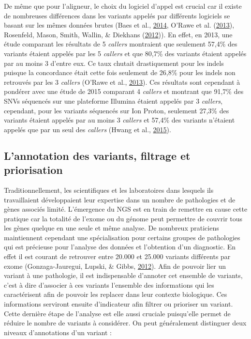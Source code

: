 \documentclass[12pt,twoside]{reedthesis}
\theoremstyle{definition}
\theoremstyle{definition}
\theoremstyle{remark}
\begin{document}
  De même que pour l'aligneur, le choix du logiciel d'appel est crucial
  car il existe de nombreuses différences dans les variants appelés par
  différents logiciels se basant sur les mêmes données brutes (Baes et
  al., \protect\hyperlink{ref-Baes2014}{2014}, O'Rawe et al.
  (\protect\hyperlink{ref-ORawe2013}{2013}), Rosenfeld, Mason, Smith,
  Wallin, \& Diekhans (\protect\hyperlink{ref-Rosenfeld2012}{2012})). En
  effet, en 2013, une étude comparant les résultats de 5 \emph{callers}
  montraient que seulement 57,4\% des variants étaient appelés par les 5
  \emph{callers} et que 80,7\% des variants étaient appelés par au moins 3
  d'entre eux. Ce taux chutait drastiquement pour les indels puisque la
  concordance était cette fois seulement de 26,8\% pour les indels non
  retrouvés par les 3 \emph{callers} (O'Rawe et al.,
  \protect\hyperlink{ref-ORawe2013}{2013}). Ces résultats sont cependant à
  pondérer avec une étude de 2015 comparant 4 \emph{callers} et montrant
  que 91,7\% des SNVs séquencés sur une plateforme Illumina étaient
  appelés par 3 \emph{callers}, cependant, pour les variants séquencés sur
  Ion Proton, seulement 27,3\% des variants étaient appelés par au moins 3
  \emph{callers} et 57,4\% des variants n'étaient appelés que par un seul
  des \emph{callers} (Hwang et al.,
  \protect\hyperlink{ref-Hwang2015}{2015}).
  
  \subsection{L'annotation des variants, filtrage et
  priorisation}\label{lannotation-des-variants-filtrage-et-priorisation}
  
  Traditionnellement, les scientifiques et les laboratoires dans lesquels
  ils travaillaient développaient leur expertise dans un nombre de
  pathologies et de gènes associés limité. L'émergence du NGS est en train
  de remettre en cause cette pratique car la totalité de l'exome ou du
  génome peut permettre de couvrir tous les gènes quelque en une seule et
  même analyse. De nombreux praticiens maintiennent cependant une
  spécialisation pour certains groupes de pathologies qui est précieuse
  pour l'analyse des données et l'obtention d'un diagnostic. En effet il
  est courant de retrouver entre 20.000 et 25.000 variants différents par
  exome (Gonzaga-Jauregui, Lupski, \& Gibbs,
  \protect\hyperlink{ref-Gonzaga-Jauregui2012}{2012}). Afin de pouvoir
  lier un variant à une pathologie, il est indispensable d'annoter cet
  ensemble de variants, c'est à dire d'associer à ces variants l'ensemble
  des informations qui les caractérisent afin de pouvoir les replacer dans
  leur contexte biologique. Ces informations serviront ensuite
  d'indicateur afin filtrer ou prioriser un variant. Cette dernière étape
  de l'analyse est elle aussi cruciale puisqu'elle permet de réduire le
  nombre de variants à considérer. On peut généralement distinguer deux
  niveaux d'annotations d'un variant :
  
\end{document}
